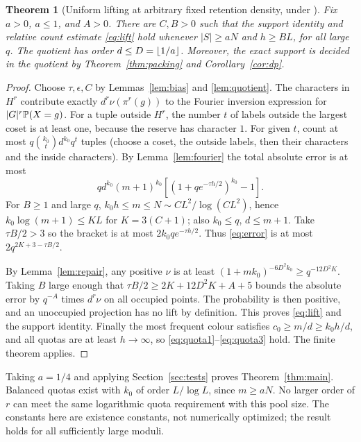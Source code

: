 \documentclass[11pt]{article}
\newtheorem{theorem}{Theorem}[section]
\theoremstyle{remark}\newtheorem{remark}[theorem]{Remark}
\begin{document}
\begin{theorem}[Uniform lifting at arbitrary fixed retention density, under \DGRH]\label{thm:lift}
Fix $a>0$, $a\le1$, and $A>0$. There are $C,B>0$ such that the support identity and relative count estimate \eqref{eq:lift} hold whenever $|S|\ge aN$ and $h\ge BL$, for all large $q$. The quotient has order $d\le D=\left\lfloor 1/a\right\rfloor$. Moreover, the exact support is decided in the quotient by Theorem~\ref{thm:packing} and Corollary~\ref{cor:dp}.
\end{theorem}
\begin{proof}
Choose $\tau,\epsilon,C$ by Lemmas~\ref{lem:bias} and \ref{lem:quotient}. The characters in $H^r$ contribute exactly $d^r\nu(\pi^r(g))$ to the Fourier inversion expression for $|G|^r\mathbb P(X=g)$. For a tuple outside $H^r$, the number $t$ of labels outside the largest coset is at least one, because the reserve has character $1$. For given $t$, count at most $q\binom{k_0}t d^{k_0}q^t$ tuples (choose a coset, the outside labels, then their characters and the inside characters). By Lemma~\ref{lem:fourier} the total absolute error is at most
\begin{equation}\label{eq:error}
 qd^{k_0}(m+1)^{k_0}\left[(1+qe^{-\tau h/2})^{k_0}-1\right].
\end{equation}
For $B\ge1$ and large $q$, $k_0 h\le m\le N\sim CL^2/\log(CL^2)$, hence $k_0\log(m+1)\le K L$ for $K=3(C+1)$; also $k_0\le q$, $d\le m+1$. Take $\tau B/2>3$ so the bracket is at most $2k_0qe^{-\tau h/2}$. Thus \eqref{eq:error} is at most $2q^{2K+3-\tau B/2}$.

By Lemma~\ref{lem:repair}, any positive $\nu$ is at least $(1+mk_0)^{-6D^2k_0}\ge q^{-12D^2K}$. Taking $B$ large enough that $\tau B/2\ge 2K+12D^2K+A+5$ bounds the absolute error by $q^{-A}$ times $d^r\nu$ on all occupied points. The probability is then positive, and an unoccupied projection has no lift by definition. This proves \eqref{eq:lift} and the support identity. Finally the most frequent colour satisfies $c_0\ge m/d\ge k_0h/d$, and all quotas are at least $h\to\infty$, so \eqref{eq:quota1}--\eqref{eq:quota3} hold. The finite theorem applies.
\end{proof}

Taking $a=1/4$ and applying Section~\ref{sec:tests} proves Theorem~\ref{thm:main}. Balanced quotas exist with $k_0$ of order $L/\log L$, since $m\ge aN$. No larger order of $r$ can meet the same logarithmic quota requirement with this pool size. The constants here are existence constants, not numerically optimized; the result holds for all sufficiently large moduli.
\end{document}
